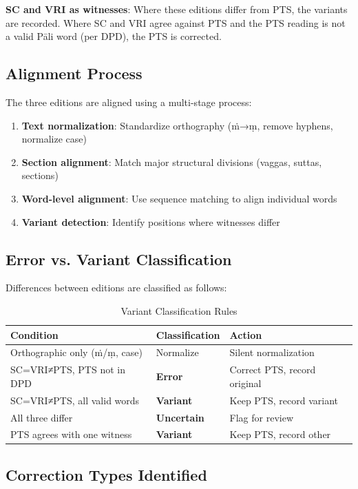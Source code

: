 \documentclass[unnumsec,webpdf,contemporary,large]{oup-authoring-template}
\begin{document}
\textbf{SC and VRI as witnesses}: Where these editions differ from PTS, the variants are recorded. Where SC and VRI agree against PTS and the PTS reading is not a valid Pāli word (per DPD), the PTS is corrected.

\subsection{Alignment Process}

The three editions are aligned using a multi-stage process:

\begin{enumerate}
\item \textbf{Text normalization}: Standardize orthography (ṁ→ṃ, remove hyphens, normalize case)
\item \textbf{Section alignment}: Match major structural divisions (vaggas, suttas, sections)
\item \textbf{Word-level alignment}: Use sequence matching to align individual words
\item \textbf{Variant detection}: Identify positions where witnesses differ
\end{enumerate}

\subsection{Error vs. Variant Classification}

Differences between editions are classified as follows:

\begin{table}[h]
\centering
\caption{Variant Classification Rules}
\begin{tabular}{lll}
\toprule
Condition & Classification & Action \\
\midrule
Orthographic only (ṁ/ṃ, case) & Normalize & Silent normalization \\
SC=VRI≠PTS, PTS not in DPD & \textbf{Error} & Correct PTS, record original \\
SC=VRI≠PTS, all valid words & \textbf{Variant} & Keep PTS, record variant \\
All three differ & \textbf{Uncertain} & Flag for review \\
PTS agrees with one witness & \textbf{Variant} & Keep PTS, record other \\
\bottomrule
\end{tabular}
\end{table}

\subsection{Correction Types Identified}
\end{document}
